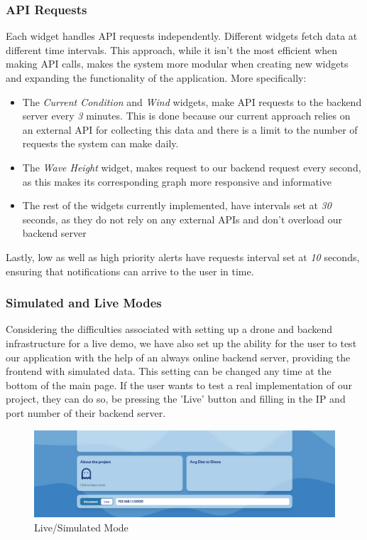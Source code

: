 \documentclass{article}
\begin{document}
    \subsubsection{API Requests}
    Each widget handles API requests independently. Different widgets fetch data at different time intervals. This approach, while it isn't the most efficient when making API calls, makes the system more modular when creating new widgets and expanding the functionality of the application. More specifically:
    \begin{itemize}
        \item The \textit{Current Condition} and \textit{Wind} widgets, make API requests to the backend server every \textit{3} minutes. This is done because our current approach relies on an external API for collecting this data and there is a limit to the number of requests the system can make daily.
        \item The \textit{Wave Height} widget, makes request to our backend request every second, as this makes its corresponding graph more responsive and informative
        \item The rest of the widgets currently implemented, have intervals set at \textit{30} seconds, as they do not rely on any external APIs and don't overload our backend server
    \end{itemize}
    Lastly, low as well as high priority alerts have requests interval set at \textit{10} seconds, ensuring that notifications can arrive to the user in time.
    
    \subsubsection{Simulated and Live Modes}
    Considering the difficulties associated with setting up a drone and backend infrastructure for a live demo, we have also set up the ability for the user to test our application with the help of an always online backend server, providing the frontend with simulated data. This setting can be changed any time at the bottom of the main page. If the user wants to test a real implementation of our project, they can do so, be pressing the 'Live' button and filling in the IP and port number of their backend server.
    
    \begin{figure}[H]
        \centering
        \includegraphics[width=1\linewidth]{assets/FE_F5.png}
        \caption{Live/Simulated Mode}
        \label{fig:simulated}
    \end{figure}
\end{document}
